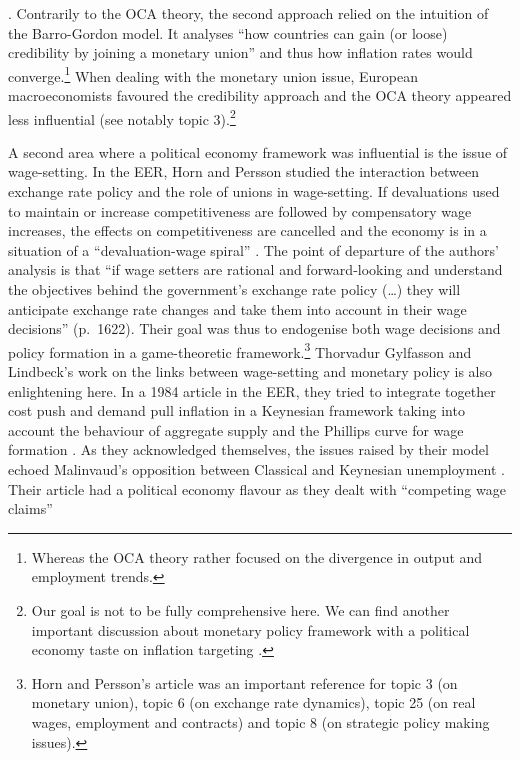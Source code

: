 \documentclass[]{elsarticle} %
\begin{document}
\citep[1091-1092]{degrauwe1996}. Contrarily to the OCA theory, the
second approach relied on the intuition of the Barro-Gordon model. It
analyses ``how countries can gain (or loose) credibility by joining a
monetary union'' and thus how inflation rates would converge.\footnote{Whereas
  the OCA theory rather focused on the divergence in output and
  employment trends.} When dealing with the monetary union issue,
European macroeconomists favoured the credibility approach and the OCA
theory appeared less influential (see notably topic 3).\footnote{Our
  goal is not to be fully comprehensive here. We can find another
  important discussion about monetary policy framework with a political
  economy taste on inflation targeting \citep[see
  notably][]{svensson1997}.}

A second area where a political economy framework was influential is the
issue of wage-setting. In the EER, Horn and Persson
\citeyearpar{horn1988} studied the interaction between exchange rate
policy and the role of unions in wage-setting. If devaluations used to
maintain or increase competitiveness are followed by compensatory wage
increases, the effects on competitiveness are cancelled and the economy
is in a situation of a ``devaluation-wage spiral''
\citep[1621]{horn1988}. The point of departure of the authors' analysis
is that ``if wage setters are rational and forward-looking and
understand the objectives behind the government's exchange rate policy
(\ldots) they will anticipate exchange rate changes and take them into
account in their wage decisions'' (p.~1622). Their goal was thus to
endogenise both wage decisions and policy formation in a game-theoretic
framework.\footnote{Horn and Persson's \citeyearpar{horn1988} article
  was an important reference for topic 3 (on monetary union), topic 6
  (on exchange rate dynamics), topic 25 (on real wages, employment and
  contracts) and topic 8 (on strategic policy making issues).} Thorvadur
Gylfasson and Lindbeck's work on the links between wage-setting and
monetary policy is also enlightening here. In a 1984 article in the EER,
they tried to integrate together cost push and demand pull inflation in
a Keynesian framework taking into account the behaviour of aggregate
supply and the Phillips curve for wage formation \citep{gylfason1984}.
As they acknowledged themselves, the issues raised by their model echoed
Malinvaud's \citeyearpar{malinvaud1977} opposition between Classical and
Keynesian unemployment \citep[6-7]{gylfason1984}. Their article had a
political economy flavour as they dealt with ``competing wage claims''
\end{document}
